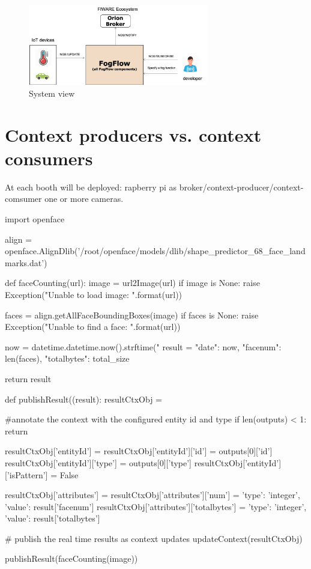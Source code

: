 \documentclass[11pt]{article}
\begin{document}
\cite{cheng2019fog}
\begin{figure}[h]
    \centering
    \includegraphics[width=0.7\textwidth]{Images/systemview.png}
    \caption{System view}
\end{figure}{}

\section{Context producers vs. context consumers}
At each booth will be deployed:
rapberry pi as broker/context-producer/context-comsumer
one or more cameras.

\begin{python}
import openface

align = openface.AlignDlib('/root/openface/models/dlib/shape_predictor_68_face_landmarks.dat')

def faceCounting(url):     
    image = url2Image(url)
    if image is None:
        raise Exception("Unable to load image: {}".format(url))
        
    faces = align.getAllFaceBoundingBoxes(image)
    if faces is None:
        raise Exception("Unable to find a face: {}".format(url))

    now = datetime.datetime.now().strftime("%
    result = {"date": now, "facenum": len(faces), "totalbytes": total_size}    

    return result
    
def publishResult((result):
    resultCtxObj = {}
        
    #annotate the context with the configured entity id and type
    if len(outputs) < 1:
        return   
    
    resultCtxObj['entityId'] = {}
    resultCtxObj['entityId']['id'] = outputs[0]['id']
    resultCtxObj['entityId']['type'] = outputs[0]['type']        
    resultCtxObj['entityId']['isPattern'] = False    
    
    resultCtxObj['attributes'] = {}
    resultCtxObj['attributes']['num'] = {'type': 'integer', 'value': result['facenum']}
    resultCtxObj['attributes']['totalbytes'] = {'type': 'integer', 'value': result['totalbytes']}    

    # publish the real time results as context updates    
    updateContext(resultCtxObj)
    
publishResult(faceCounting(image))
\end{python}
\end{document}
